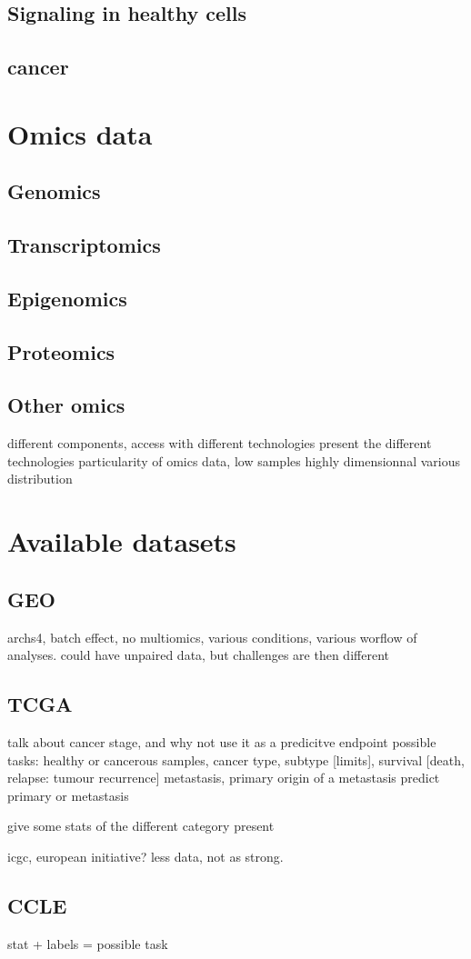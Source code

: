 \documentclass[../main.tex]{subfiles}
\begin{document}
\subsection{Signaling in healthy cells}
\subsection{cancer}


\section{Omics data}
\subsection{Genomics}
\subsection{Transcriptomics}
\subsection{Epigenomics}
\subsection{Proteomics}
\subsection{Other omics}
different components, access with different technologies
present the different technologies
particularity of omics data, low samples highly dimensionnal
various distribution

\section{Available datasets}
\subsection{GEO}
archs4, batch effect, no multiomics, various conditions, various worflow of analyses.
could have unpaired data, but challenges are then different
\subsection{TCGA}
talk about cancer stage, and why not use it as a predicitve endpoint
possible tasks: healthy or cancerous samples, cancer type, subtype [limits], survival [death, relapse: tumour recurrence] metastasis,
primary origin of a metastasis %
predict primary or metastasis %

give some stats of the different category present

icgc, european initiative? less data, not as strong.
\subsection{CCLE}

stat + labels = possible task
\end{document}
